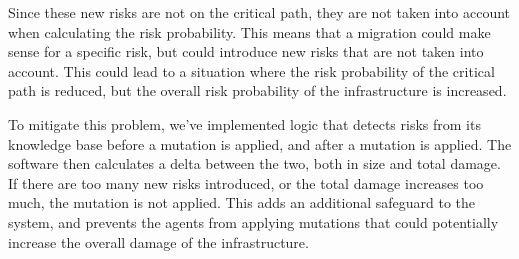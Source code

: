 Since these new risks are not on the critical path, they are not taken into account when calculating the risk probability. This means that a migration could make sense for a specific risk, but could introduce new risks that are not taken into account. This could lead to a situation where the risk probability of the critical path is reduced, but the overall risk probability of the infrastructure is increased. 

To mitigate this problem, we've implemented logic that detects risks from its knowledge base before a mutation is applied, and after a mutation is applied. The software then calculates a delta between the two, both in size and total damage. If there are too many new risks introduced, or the total damage increases too much, the mutation is not applied. This adds an additional safeguard to the system, and prevents the agents from applying mutations that could potentially increase the overall damage of the infrastructure.

